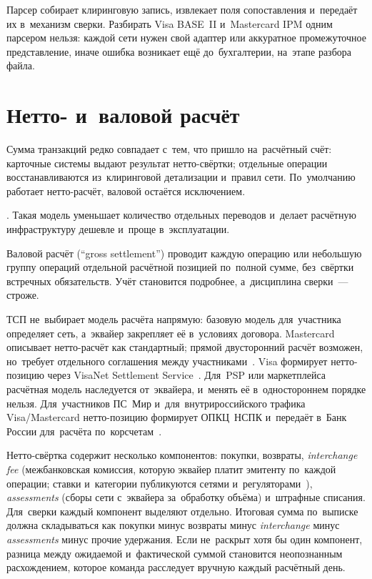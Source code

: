 Парсер собирает клиринговую запись, извлекает поля сопоставления и~передаёт
их в~механизм сверки. Разбирать Visa BASE~II и~Mastercard IPM одним парсером
нельзя: каждой сети нужен свой адаптер или аккуратное промежуточное
представление, иначе ошибка возникает ещё до~бухгалтерии, на~этапе разбора
файла.

\section{Нетто- и~валовой расчёт}\label{sec:recon-net-vs-gross}

Сумма транзакций редко совпадает с~тем, что пришло на~расчётный счёт: карточные
системы выдают результат нетто-свёртки; отдельные операции восстанавливаются
из~клиринговой детализации и~правил сети.
По~умолчанию работает нетто-расчёт, валовой остаётся исключением.

. Такая модель уменьшает количество
отдельных переводов и~делает расчётную инфраструктуру дешевле и~проще
в~эксплуатации.

Валовой расчёт (\enquote{gross settlement}) проводит каждую операцию или
небольшую группу операций отдельной расчётной позицией по~полной сумме,
без~свёртки встречных обязательств. Учёт становится подробнее, а~дисциплина
сверки~--- строже.

ТСП не~выбирает модель расчёта напрямую: базовую модель для~участника
определяет сеть, а~эквайер закрепляет её в~условиях договора. Mastercard
описывает нетто-расчёт как стандартный; прямой двусторонний расчёт возможен,
но~требует отдельного соглашения между участниками~\cite{mc-rules}. Visa
формирует нетто-позицию через VisaNet Settlement Service~\cite{visa-core-rules}.
Для~PSP или маркетплейса расчётная модель наследуется от~эквайера, и~менять её
в~одностороннем порядке нельзя. Для~участников ПС~Мир
и~для~внутрироссийского трафика Visa/Mastercard нетто-позицию формирует
ОПКЦ~НСПК и~передаёт в~Банк России для~расчёта
по~корсчетам~\cite{nspk-mir-rules,cbr-ps}.

Нетто-свёртка содержит несколько компонентов: покупки, возвраты,
\textit{interchange fee} (межбанковская комиссия, которую эквайер платит
  эмитенту по~каждой операции; ставки и~категории публикуются сетями
и~регуляторами~\cite{visa-interchange,eu-ifr}), \textit{assessments} (сборы
сети с~эквайера за~обработку объёма) и~штрафные списания. Для~сверки
каждый компонент выделяют отдельно. Итоговая сумма
по~выписке должна складываться как покупки минус возвраты минус \textit{interchange}
минус \textit{assessments} минус прочие удержания. Если не~раскрыт хотя бы один
компонент, разница между ожидаемой и~фактической суммой становится неопознанным
расхождением, которое команда расследует вручную каждый расчётный день.

